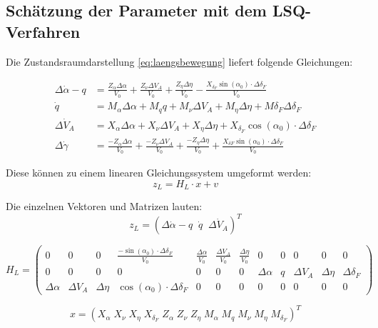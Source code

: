 \subsection{Schätzung der Parameter mit dem LSQ-Verfahren} 

Die Zustandsraumdarstellung \eqref{eq:laengsbewegung} liefert folgende Gleichungen: 

\begin{align}
	\Delta\dot \alpha-q &=  \frac{Z_{\alpha}\Delta\alpha}{V_0} + \frac{Z_{\nu}\Delta V_{A}}{V_0} + 
	\frac{Z_{\eta}\Delta\eta}{V_0} - \frac{X_{\delta_F}\sin{(\alpha_0)}\cdot\Delta\delta_F}{V_0}\\
	\dot q &= M_{\alpha}\Delta\alpha + M_q q + M_{\nu}\Delta V_A + M_{\eta}\Delta\eta + M{\delta_F}\Delta\delta_F\\
	\Delta\dot V_A &= X_{\alpha}\Delta\alpha +  X_{\nu}\Delta V_A + X_{\eta}\Delta\eta + 
	X_{\delta_F}\cos{(\alpha_0)}\cdot\Delta\delta_F \\
	\Delta \dot \gamma &= \frac{- Z_{\alpha}\Delta\alpha}{V_0} + \frac{- Z_{\nu}\Delta V_{A}}{V_0} + 
	\frac{-Z_{\eta}\Delta\eta}{V_0} + \frac{X_{\delta F}\sin{(\alpha_0)}\cdot\Delta\delta_F}{V_0}
\end{align}
	
Diese können zu einem linearen Gleichungssystem umgeformt werden: 
\begin{equation}
    z_{L}= H_{L}\cdot x + v
\end{equation}

Die einzelnen Vektoren und Matrizen lauten:
\setcounter{MaxMatrixCols}{15}
\begin{equation}
	z_{L} = (\Delta\dot \alpha-q \;\; \dot q \;\; \Delta\dot V_A)^T
\end{equation}

\begin{equation}
	 H_{L} = \begin{pmatrix}
		0&0&0& \frac{-\sin{(\alpha_0)}\cdot\Delta\delta_F}{V_0} & \frac{\Delta\alpha}{V_0}& \frac{\Delta V_A}{V_0} & 
		\frac{\Delta\eta}{V_0} &0&0&0&0&0   \\
		0&0&0&0&0&0&0 &\Delta\alpha & q & \Delta V_A & \Delta\eta & \Delta\delta_F \\
		\Delta\alpha &  \Delta V_A & \Delta\eta & \cos{(\alpha_0)}\cdot\Delta\delta_F &0&0&0&0&0&0&0&0 
	\end{pmatrix}
\end{equation}

\begin{equation}
	x = (X_{\alpha}\; 
	X_{\nu}\;
	X_{\eta}\;
	X_{\delta_F}\; 
	Z_{\alpha}\; 
	Z_{\nu}\;
	Z_{\eta}\;
	M_{\alpha}\;
	M_{q}\;
	M_{\nu}\;
	M_{\eta}\;
	M_{\delta_F})^T
\end{equation}

